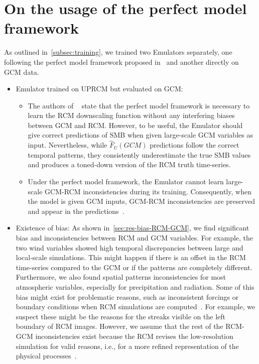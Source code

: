 \documentclass[a4paper,11pt,oneside]{report}
\begin{document}
\section{On the usage of the perfect model framework}\label{sec:disc-perfect-model}
As outlined in~\ref{subsec:training}, we trained two Emulators separately, one following the perfect model framework proposed in~\cite{Doury} and another directly on GCM data. 
\begin{itemize}
    \item Emulator trained on UPRCM but evaluated on GCM: 
    \begin{itemize}
        \item The authors of ~\cite{Doury} state that the perfect model framework is necessary to learn the RCM downscaling function without any interfering biases between GCM and RCM. However, to be useful, the Emulator should give correct predictions of SMB when given large-scale GCM variables as input. Nevertheless, while $\hat{F}_{U}(GCM)$ predictions follow the correct temporal patterns, they consistently underestimate the true SMB values and produces a toned-down version of the RCM truth time-series.
        \item Under the perfect model framework, the Emulator cannot learn large-scale GCM-RCM inconsistencies during its training. Consequently, when the model is given GCM inputs, GCM-RCM inconsistencies are preserved and appear in the predictions~\cite{Doury}.
    \end{itemize}
    \item Existence of bias: As shown in~\ref{sec:res-bias-RCM-GCM}, we find significant bias and inconsistencies between RCM and GCM variables. For example, the two wind variables showed high temporal discrepancies between large and local-scale simulations. This might happen if there is an offset in the RCM time-series compared to the GCM or if the patterns are completely different. Furthermore, we also found spatial patterns inconsistencies for most atmospheric variables, especially for precipitation and radiation. Some of this bias might exist for problematic reasons, such as inconsistent forcings or boundary conditions when RCM simulations are computed~\cite{Doury, Laprise2008ChallengingST}. For example, we suspect these might be the reasons for the streaks visible on the left boundary of RCM images. However, we assume that the rest of the RCM-GCM inconsistencies exist because the RCM revises the low-resolution simulation for valid reasons, i.e., for a more refined representation of the physical processes~\cite{Doury}. 

\end{itemize}
\end{document}
